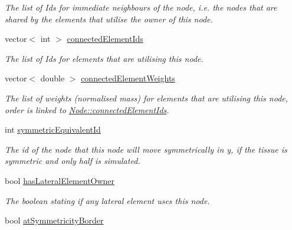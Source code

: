 \begin{DoxyCompactItemize}
\begin{DoxyCompactList}\small\item\em The list of Id\textquotesingle{}s for immediate neighbours of the node, i.\+e. the nodes that are shared by the elements that utilise the owner of this node. \end{DoxyCompactList}\item 
\hypertarget{classNode_a18bae606efb025cc90b4c117776e0bf9}{}vector$<$ int $>$ \hyperlink{classNode_a18bae606efb025cc90b4c117776e0bf9}{connected\+Element\+Ids}\label{classNode_a18bae606efb025cc90b4c117776e0bf9}

\begin{DoxyCompactList}\small\item\em The list of Id\textquotesingle{}s for elements that are utilising this node. \end{DoxyCompactList}\item 
\hypertarget{classNode_a7ffccd2a70d08c1a42d4701f32a266c5}{}vector$<$ double $>$ \hyperlink{classNode_a7ffccd2a70d08c1a42d4701f32a266c5}{connected\+Element\+Weights}\label{classNode_a7ffccd2a70d08c1a42d4701f32a266c5}

\begin{DoxyCompactList}\small\item\em The list of weights (normalised mass) for elements that are utilising this node, order is linked to \hyperlink{classNode_a18bae606efb025cc90b4c117776e0bf9}{Node\+::connected\+Element\+Ids}. \end{DoxyCompactList}\item 
\hypertarget{classNode_ad29e0f81f8c0a5d4a3e891d3b239af7e}{}int \hyperlink{classNode_ad29e0f81f8c0a5d4a3e891d3b239af7e}{symmetric\+Equivalent\+Id}\label{classNode_ad29e0f81f8c0a5d4a3e891d3b239af7e}

\begin{DoxyCompactList}\small\item\em The id of the node that this node will move symmetrically in y, if the tissue is symmetric and only half is simulated. \end{DoxyCompactList}\item 
\hypertarget{classNode_a71d38b47678cff15e338f9c917d32696}{}bool \hyperlink{classNode_a71d38b47678cff15e338f9c917d32696}{has\+Lateral\+Element\+Owner}\label{classNode_a71d38b47678cff15e338f9c917d32696}

\begin{DoxyCompactList}\small\item\em The boolean stating if any lateral element uses this node. \end{DoxyCompactList}\item 
\hypertarget{classNode_ae14618d71e657039ed84316154be7330}{}bool \hyperlink{classNode_ae14618d71e657039ed84316154be7330}{at\+Symmetricity\+Border}\label{classNode_ae14618d71e657039ed84316154be7330}


\end{DoxyCompactItemize}
